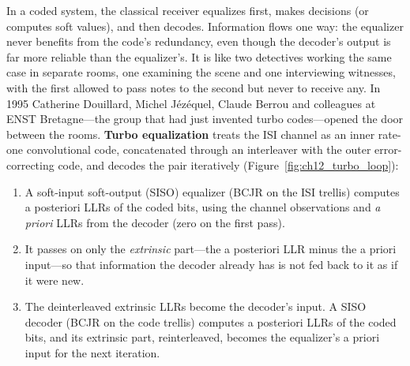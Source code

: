 In a coded system, the classical receiver equalizes first, makes decisions (or computes soft values),
and then decodes. Information flows one way: the equalizer never benefits from the code's
redundancy, even though the decoder's output is far more reliable than the equalizer's. It is like
two detectives working the same case in separate rooms, one examining the scene and one interviewing
witnesses, with the first allowed to pass notes to the second but never to receive any. In 1995
Catherine Douillard, Michel J\'ez\'equel, Claude Berrou and colleagues at ENST Bretagne---the group that
had just invented turbo codes---opened the door between the rooms. \textbf{Turbo
equalization} treats the ISI channel as an inner rate-one convolutional code,
concatenated through an interleaver with the outer error-correcting code, and decodes the pair
iteratively (Figure~\ref{fig:ch12_turbo_loop}):
\begin{enumerate}
\item A soft-input soft-output (SISO) equalizer (BCJR on the ISI trellis) computes a posteriori LLRs of
the coded bits, using the channel observations and \emph{a priori} LLRs from the decoder (zero on the
first pass).
\item It passes on only the \emph{extrinsic} part---the a posteriori LLR minus the a priori
input---so that information the decoder already has is not fed back to it as if it were new.
\item The deinterleaved extrinsic LLRs become the decoder's input. A SISO decoder (BCJR on the code
trellis) computes a posteriori LLRs of the coded bits, and its extrinsic part, reinterleaved, becomes
the equalizer's a priori input for the next iteration.
\end{enumerate}

